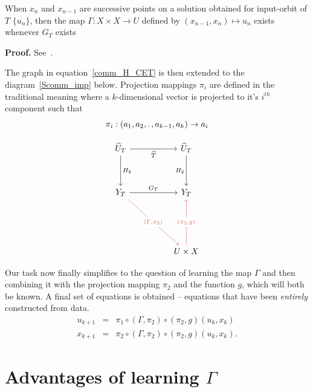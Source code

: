 \begin{Theorem}
  When $x_n$ and $x_{n-1}$ are successive points on a solution obtained for input-orbit of $T$ $\{u_n\}$, then the map $\Gamma: X\times{X}\to{U}$ defined by $(x_{n-1},x_n)\mapsto{u_n}$ exists whenever $G_T$ exists 
\end{Theorem}
\vspace{-6mm}
{\bf Proof.}  See~\cite[Theorem. 3c]{manjunath2021universal}.

The graph in equation~\ref{comm_H_CET} is then extended to the diagram~\ref{Scomm_imp} below.
Projection mappings $\pi_i$ are defined in the traditional meaning where a $k$-dimensional vector is projected to it's $i^{th}$ component such that \[\pi_i:(a_1,a_2, \ldotp, a_{k-1}, a_k)\to{a_i}\]

\begin{equation} \label{Scomm_imp}
\begin{tikzcd}
	{\widehat{U}_T} && {\widehat{U}_T} \\
	\\
	{Y_T} && {Y_T} \\
	\\
	\\
	&& {U\times X}
	\arrow["{\widehat{T}}"', from=1-1, to=1-3]
	\arrow["{H_2}", from=1-1, to=3-1]
	\arrow["{H_2}"', from=1-3, to=3-3]
	\arrow["{G_T}", from=3-1, to=3-3]
	\arrow["{(\Gamma, \pi_2)}"{description}, color={rgb,255:red,214;green,92;blue,92}, from=3-1, to=6-3]
	\arrow["{(\pi_2, g)}"{description}, color={rgb,255:red,214;green,92;blue,92}, from=6-3, to=3-3]
\end{tikzcd}
\end{equation}


Our task now finally simplifies to the question of learning the map $\Gamma$ and then combining it with the projection mapping $\pi_2$ and the function $g$, which will both be known. A final set of equations is obtained -- equations that have been \textit{entirely} constructed from data.
\begin{eqnarray}\label{eqns_from_data}
	u_{k+1} &=& \pi_1 \circ (\Gamma, \pi_2) \circ (\pi_2,g) (u_k,x_k) \label{Seqn_u}\\
	x_{k+1} &=& \pi_2 \circ (\Gamma, \pi_2) \circ (\pi_2,g) (u_k,x_k). \label{Seqn_x}
\end{eqnarray}



\section{Advantages of learning $\Gamma$}\label{subs_LearnGamma}

